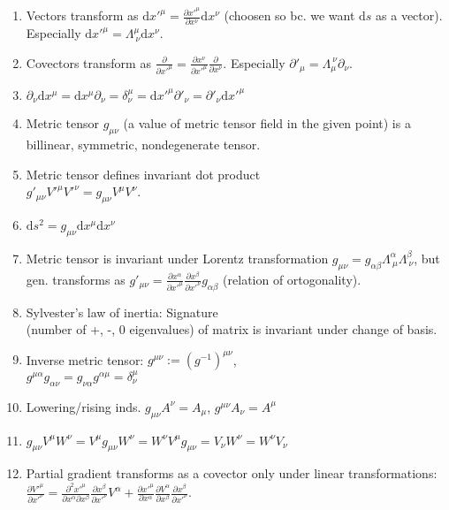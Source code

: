 \documentclass{article}
\renewcommand\d{\mathrm d}
\begin{document}
\begin{multicols}{3}

    \begin{enumerate}
        \item Vectors transform as $\d x'^\mu=\frac{\partial x'^\mu}{\partial x^\nu}\d x^\nu$ (choosen so bc. we want $\d s$ as a vector). Especially $\d x'^\mu=\Lambda^\mu_{~\nu}\d x^\nu$.
        \item Covectors transform as $\frac{\partial}{\partial x'^\mu}=\frac{\partial x^\nu}{\partial x'^\mu}\frac{\partial}{\partial x^\nu}$. Especially $\partial'_\mu=\Lambda_\mu^{~\nu}\partial_\nu$.
        \item $\partial_\nu\d x^\mu=\d x^\mu\partial_\nu=\delta^\mu_\nu=\d x'^\mu\partial'_\nu=\partial'_\nu\d x'^\mu$
        \item Metric tensor $g_{\mu\nu}$ (a value of metric tensor field in the given point) is a billinear, symmetric, nondegenerate tensor.
        \item Metric tensor defines invariant dot product\\ $g'_{\mu\nu}V'^\mu V'^\nu=g_{\mu\nu}V^\mu V^\nu$.
        \item $\d s^2=g_{\mu\nu}\d x^\mu\d x^\nu$
        \item Metric tensor is invariant under Lorentz transformation $g_{\mu\nu}=g_{\alpha\beta}\Lambda^\alpha_{~\mu}\Lambda^\beta_{~\nu}$, but gen. transforms as  $g'_{\mu\nu}=\frac{\partial x^\alpha}{\partial x'^\mu}\frac{\partial x^\beta}{\partial x'^\nu}g_{\alpha\beta}$ (relation of ortogonality).
        \item Sylvester's law of inertia: Signature\\ (number of +, -, 0 eigenvalues) of matrix is invariant under change of basis.
        \item Inverse metric tensor: $g^{\mu\nu}:=\left(g^{-1}\right)^{\mu\nu}$,\\ $g^{\mu\alpha}g_{\alpha\nu}=g_{\nu\alpha}g^{\alpha\mu}=\delta^\mu_\nu$
        \item Lowering/rising inds. $g_{\mu\nu}A^\nu=A_\mu$, $g^{\mu\nu}A_\nu=A^\mu$
        \item $g_{\mu\nu}V^\mu W^\nu=V^\mu g_{\mu\nu}W^\nu=W^\nu V^\mu g_{\mu\nu}=V_\nu W^\nu=W^\nu V_\nu$
        \item Partial gradient transforms as a covector only under linear transformations:\\
            $\frac{\partial V'^\mu}{\partial x'^\nu}=\frac{\partial^2 x'^\mu}{\partial x^\alpha\partial x^\beta}\frac{\partial x^\beta}{\partial x'^\nu}V^\alpha+\frac{\partial x'^\mu}{\partial x^\alpha}\frac{\partial V^\alpha}{\partial x^\beta}\frac{\partial x^\beta}{\partial x'^\nu}$.

\end{enumerate}
\end{multicols}
\end{document}
